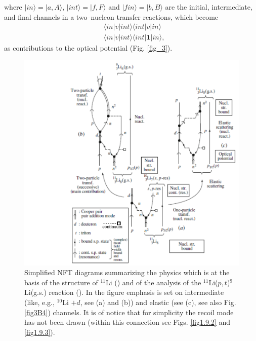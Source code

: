 where $|in\rangle=|a,A\rangle,\,|int\rangle=|f,F\rangle$ and $|fin\rangle=|b,B\rangle$ are the initial, intermediate, and final channels in a two--nucleon transfer reactions, which become
\begin{equation}
\begin{split}
&\langle in|v|int\rangle\langle int |v|in\rangle\\
&\langle in|v|int\rangle\langle int |\mathbf{1}|in\rangle,
\end{split}
\end{equation}
as contributions to the optical potential (Fig. \ref{fig_3}).

\begin{figure}
\centerline{\includegraphics*[width=15cm,angle=0]{nutshell/figs/fig3B3.pdf}}
\caption{Simplified NFT diagrams summarizing the physics which is at the basis of the structure of $^{11}$Li (\cite{Barranco:01}) and of the analysis of the
$^{11}$Li($p, t$)$^{9}$Li(g.s.) reaction (\cite{Potel:10}). In the figure emphasis is
set on intermediate (like, e.g., $^{10}$Li $+d$, see (a) and (b)) and elastic (see (c), see also Fig. \ref{fig3B4}) channels. It is of notice that for simplicity 	the recoil mode has not been drawn (within this connection see Figs. \ref{fig1.9.2} and \ref{fig1.9.3}).}\label{fig3B3}
\end{figure}
